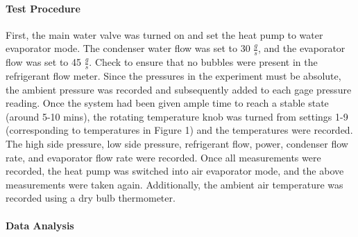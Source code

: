 \documentclass{article}
\begin{document}
\paragraph{Test Procedure}
First, the main water valve was turned on and set the heat pump to water evaporator mode. The condenser water flow was set to 30 $ \frac{g}{s} $, and the evaporator flow was set to 45 $ \frac{g}{s} $. Check to ensure that no bubbles were present in the refrigerant flow meter. Since the pressures in the experiment must be absolute, the ambient pressure was recorded and subsequently added to each gage pressure reading.  Once the system had been given ample time to reach a stable state (around 5-10 mins), the rotating temperature knob was turned from settings 1-9 (corresponding to temperatures in Figure 1) and the temperatures were recorded. The high side pressure, low side pressure, refrigerant flow, power, condenser flow rate, and evaporator flow rate were recorded. Once all measurements were recorded, the heat pump was switched into air evaporator mode, and the above measurements were taken again. Additionally, the ambient air temperature was recorded using a dry bulb thermometer. 

\paragraph{Data Analysis}
\end{document}
